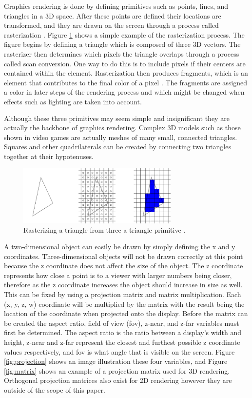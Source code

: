 \documentclass{article}
\begin{document}
Graphics rendering is done by defining primitives such as points, lines, and triangles in a 3D space. After these points are defined their locations are transformed, and they are drawn on the screen through a process called rasterization \cite{mckesson2018}. Figure \ref{fig:triangle-rendering} shows a simple example of the rasterization process. The figure begins by defining a triangle which is composed of three 3D vectors. The rasterizer then determines which pixels the triangle overlaps through a process called scan conversion. One way to do this is to include pixels if their centers are contained within the element. Rasterization then produces fragments, which is an element that contributes to the final color of a pixel \cite{sellers2016}. The fragments are assigned a color in later steps of the rendering process and which might be changed when effects such as lighting are taken into account.

Although these three primitives may seem simple and insignificant they are actually the backbone of graphics rendering. Complex 3D models such as those shown in video games are actually meshes of many small, connected triangles. Squares and other quadrilaterals can be created by connecting two triangles together at their hypotenuses.

\begin{figure}[h]
	\centering
	\includegraphics[height=3cm]{triangle-rendering}
	\caption{Rasterizing a triangle from three a triangle primitive \cite{mckesson2018}.}
	\label{fig:triangle-rendering}
\end{figure}

A two-dimensional object can easily be drawn by simply defining the x and y coordinates. Three-dimensional objects will not be drawn correctly at this point because the z coordinate does not affect the size of the object. The z coordinate represents how close a point is to a viewer with larger numbers being closer, therefore as the z coordinate increases the object should increase in size as well. This can be fixed by using a projection matrix and matrix multiplication. Each (x, y, z, w) coordinate will be multiplied by the matrix with the result being the location of the coordinate when projected onto the display. Before the matrix can be created the aspect ratio, field of view (fov), z-near, and z-far variables must first be determined. The aspect ratio is the ratio between a display's width and height, z-near and z-far represent the closest and furthest possible z coordinate values respectively, and fov is what angle that is visible on the screen. Figure \ref{fig:projection} shows an image illustration these four variables, and Figure \ref{fig:matrix} shows an example of a projection matrix used for 3D rendering. Orthogonal projection matrices also exist for 2D rendering however they are outside of the scope of this paper.
\end{document}
